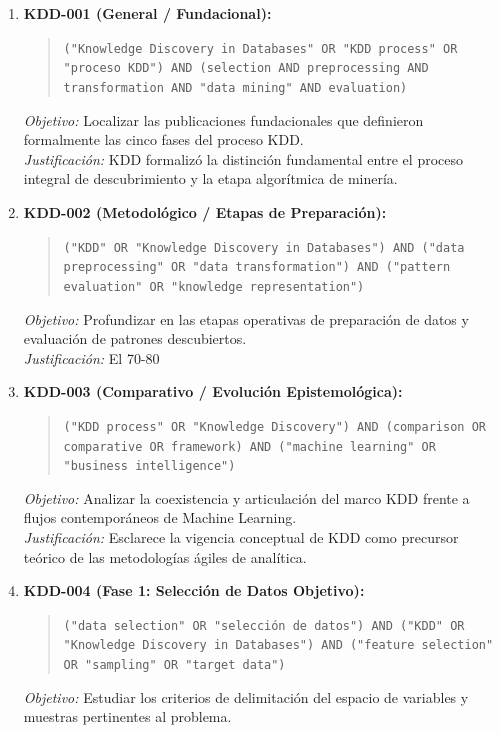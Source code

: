 \begin{enumerate}
  \item \textbf{KDD-001 (General / Fundacional):}
  \begin{quote}
  \texttt{("Knowledge Discovery in Databases" OR "KDD process" OR "proceso KDD") AND (selection AND preprocessing AND transformation AND "data mining" AND evaluation)}
  \end{quote}
  \textit{Objetivo:} Localizar las publicaciones fundacionales que definieron formalmente las cinco fases del proceso KDD.\\
  \textit{Justificación:} KDD formalizó la distinción fundamental entre el proceso integral de descubrimiento y la etapa algorítmica de minería.
  \item \textbf{KDD-002 (Metodológico / Etapas de Preparación):}
  \begin{quote}
  \texttt{("KDD" OR "Knowledge Discovery in Databases") AND ("data preprocessing" OR "data transformation") AND ("pattern evaluation" OR "knowledge representation")}
  \end{quote}
  \textit{Objetivo:} Profundizar en las etapas operativas de preparación de datos y evaluación de patrones descubiertos.\\
  \textit{Justificación:} El 70-80%
  \item \textbf{KDD-003 (Comparativo / Evolución Epistemológica):}
  \begin{quote}
  \texttt{("KDD process" OR "Knowledge Discovery") AND (comparison OR comparative OR framework) AND ("machine learning" OR "business intelligence")}
  \end{quote}
  \textit{Objetivo:} Analizar la coexistencia y articulación del marco KDD frente a flujos contemporáneos de Machine Learning.\\
  \textit{Justificación:} Esclarece la vigencia conceptual de KDD como precursor teórico de las metodologías ágiles de analítica.
  \item \textbf{KDD-004 (Fase 1: Selección de Datos Objetivo):}
  \begin{quote}
  \texttt{("data selection" OR "selección de datos") AND ("KDD" OR "Knowledge Discovery in Databases") AND ("feature selection" OR "sampling" OR "target data")}
  \end{quote}
  \textit{Objetivo:} Estudiar los criterios de delimitación del espacio de variables y muestras pertinentes al problema.\\

\end{enumerate}
